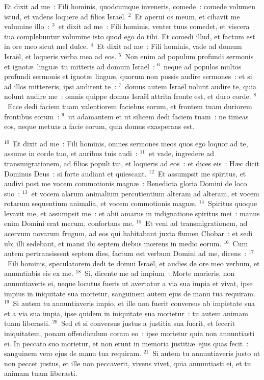 \lettrine[lines=10,image=true,loversize=0.05,lraise=-0.03]{E}{}t dixit ad me~: Fili hominis, quodcumque inveneris, comede~: comede volumen istud, et vadens loquere ad filios Isra\"el.
${}^{2}$~Et aperui os meum, et cibavit me volumine illo~:
${}^{3}$~et dixit ad me~: Fili hominis, venter tuus comedet, et viscera tua complebuntur volumine isto quod ego do tibi. Et comedi illud, et factum est in ore meo sicut mel dulce.
${}^{4}$~Et dixit ad me~: Fili hominis, vade ad domum Isra\"el, et loqueris verba mea ad eos.
${}^{5}$~Non enim ad populum profundi sermonis et ignot\ae\ lingu\ae\ tu mitteris ad domum Isra\"el~:
${}^{6}$~neque ad populos multos profundi sermonis et ignot\ae\ lingu\ae , quorum non possis audire sermones~: et si ad illos mittereris, ipsi audirent te~:
${}^{7}$~domus autem Isra\"el nolunt audire te, quia nolunt audire me~: omnis quippe domus Isra\"el attrita fronte est, et duro corde.
${}^{8}$~Ecce dedi faciem tuam valentiorem faciebus eorum, et frontem tuam duriorem frontibus eorum~:
${}^{9}$~ut adamantem et ut silicem dedi faciem tuam~: ne timeas eos, neque metuas a facie eorum, quia domus exasperans est.


${}^{10}$~Et dixit ad me~: Fili hominis, omnes sermones meos quos ego loquor ad te, assume in corde tuo, et auribus tuis audi~:
${}^{11}$~et vade, ingredere ad transmigrationem, ad filios populi tui, et loqueris ad eos~: et dices eis~: H\ae c dicit Dominus Deus~: si forte audiant et quiescant.
${}^{12}$~Et assumpsit me spiritus, et audivi post me vocem commotionis magn\ae~: Benedicta gloria Domini de loco suo~:
${}^{13}$~et vocem alarum animalium percutientium alteram ad alteram, et vocem rotarum sequentium animalia, et vocem commotionis magn\ae .
${}^{14}$~Spiritus quoque levavit me, et assumpsit me~: et abii amarus in indignatione spiritus mei~: manus enim Domini erat mecum, confortans me.
${}^{15}$~Et veni ad transmigrationem, ad acervum novarum frugum, ad eos qui habitabant juxta flumen Chobar~: et sedi ubi illi sedebant, et mansi ibi septem diebus mœrens in medio eorum.
${}^{16}$~Cum autem pertransissent septem dies, factum est verbum Domini ad me, dicens~:
${}^{17}$~Fili hominis, speculatorem dedi te domui Isra\"el, et audies de ore meo verbum, et annuntiabis eis ex me.
${}^{18}$~Si, dicente me ad impium~: Morte morieris, non annuntiaveris ei, neque locutus fueris ut avertatur a via sua impia et vivat, ipse impius in iniquitate sua morietur, sanguinem autem ejus de manu tua requiram.
${}^{19}$~Si autem tu annuntiaveris impio, et ille non fuerit conversus ab impietate sua et a via sua impia, ipse quidem in iniquitate sua morietur~: tu autem animam tuam liberasti.
${}^{20}$~Sed et si conversus justus a justitia sua fuerit, et fecerit iniquitatem, ponam offendiculum coram eo~: ipse morietur quia non annuntiasti ei. In peccato suo morietur, et non erunt in memoria justiti\ae\ ejus quas fecit~: sanguinem vero ejus de manu tua requiram.
${}^{21}$~Si autem tu annuntiaveris justo ut non peccet justus, et ille non peccaverit, vivens vivet, quia annuntiasti ei, et tu animam tuam liberasti.


